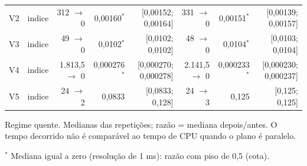 {\begin{tabular}{llrrrrrr}
V2 & indice & 312 $\to$ 0 & 0,00160$^{*}$ & [0,00152; 0,00164] & 331 $\to$ 0 & 0,00151$^{*}$ & [0,00139; 0,00157] \\
V3 & indice & 49 $\to$ 0 & 0,0102$^{*}$ & [0,0102; 0,0102] & 48 $\to$ 0 & 0,0104$^{*}$ & [0,0103; 0,0104] \\
V4 & indice & 1.813,5 $\to$ 0 & 0,000276$^{*}$ & [0,000270; 0,000278] & 2.141,5 $\to$ 0 & 0,000233$^{*}$ & [0,000230; 0,000237] \\
V5 & indice & 24 $\to$ 2 & 0,0833 & [0,0833; 0,128] & 24 $\to$ 3 & 0,125 & [0,125; 0,125] \\
\bottomrule
\end{tabular}\par
\vspace{3pt}
\begin{minipage}{\linewidth}\footnotesize
Regime quente. Medianas das repetições; razão = mediana depois/antes. O tempo decorrido não é comparável ao tempo de CPU quando o plano é paralelo.\par
$^{*}$ Mediana igual a zero (resolução de 1 ms): razão com piso de 0,5 (cota).
\end{minipage}
}
